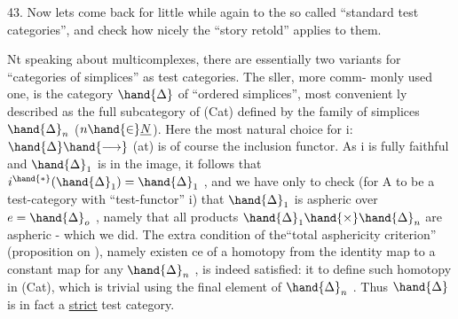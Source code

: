 
43.   Now lets come back for  little while again to the so called ``standard
test categories'', and check how nicely the ``story retold'' applies to them.

N\hand{\ensuremath{\overset{\smile}{\textcolor{black}{o}}}}t speaking about multicomplexes, there are essentially two variants
for ``categories of simplices'' as test categories. The sller, more comm-%
monly used one, is the category $\hand{\Delta}$ of ``ordered simplices'', most convenient%
ly described as the full subcategory of (Cat) defined by the family of
simplices $\hand{\Delta}_n$ ($n \hand{\in} \underline{N}$). Here the most natural choice for i: $\hand{\Delta} \hand{\longrightarrow}$ (at) is
of course the inclusion functor.  As i is fully faithful and $\hand{\Delta}_1$ is in the image, it follows
that $i^{\hand{*}}(\hand{\Delta}_1) = \hand{\Delta}_1$ , and we have only to check (for A to be a test-category
with ``test-functor'' i) that $\hand{\Delta}_1$ is  aspheric over $e=\hand{\Delta}_o$ , namely that
all products $\hand{\Delta}_1 \hand{\times} \hand{\Delta}_n$ are aspheric - which we did. The extra condition
of the``total asphericity criterion'' (proposition on ), namely existen%
\hand{-}ce of a homotopy  from the  identity map to a constant map\hand{,} for any
$\hand{\Delta}_n$ , is indeed satisfied: it   to define such homotopy
in (Cat), which is trivial using the final element of $\hand{\Delta}_n$ . Thus $\hand{\Delta}$ is
in fact a \uline{strict} test category.

